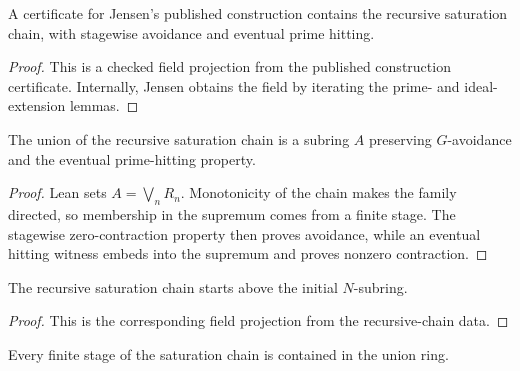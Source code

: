 \begin{lemma}
  \label{lem:jensen_saturation_recursive_chain_source}
  A certificate for Jensen's published construction contains the recursive
  saturation chain, with stagewise avoidance and eventual prime hitting.
\end{lemma}

\begin{proof}
  This is a checked field projection from the published construction
  certificate.  Internally, Jensen obtains the field by iterating the prime-
  and ideal-extension lemmas.
\end{proof}

\begin{lemma}
  \label{lem:jensen_saturation_union_source}
  The union of the recursive saturation chain is a subring \(A\) preserving
  \(G\)-avoidance and the eventual prime-hitting property.
\end{lemma}

\begin{proof}
  Lean sets \(A=\bigvee_n R_n\).  Monotonicity of the chain makes the family
  directed, so membership in the supremum comes from a finite stage.  The
  stagewise zero-contraction property then proves avoidance, while an eventual
  hitting witness embeds into the supremum and proves nonzero contraction.
\end{proof}

\begin{lemma}
  \label{lem:jensen_saturation_recursive_chain_starts}
  The recursive saturation chain starts above the initial \(N\)-subring.
\end{lemma}

\begin{proof}
  This is the corresponding field projection from the recursive-chain data.
\end{proof}

\begin{lemma}
  \label{lem:jensen_saturation_union_chain_le}
  Every finite stage of the saturation chain is contained in the union ring.
\end{lemma}

